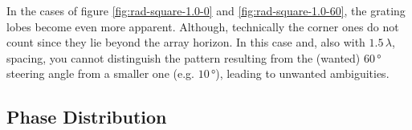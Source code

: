 In the cases of figure \ref{fig:rad-square-1.0-0} and \ref{fig:rad-square-1.0-60}, the grating lobes become even more apparent. Although, technically the corner ones do not count since they lie beyond the array horizon. In this case and, also with $1.5\,\lambda$, spacing, you cannot distinguish the pattern resulting from the (wanted) $60\,\si{\degree}$ steering angle from a smaller one (e.g. $10\,\si{\degree}$), leading to unwanted ambiguities.



\subsection{Phase Distribution}


